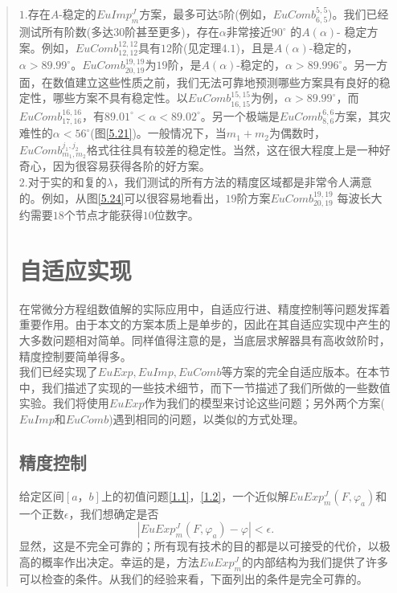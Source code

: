 \documentclass{article}
\begin{document}
\begin{CJK}{UTF8}{gkai}
\begin{quotation}
$1$.存在$A$-稳定的$EuImp^J_m$方案，最多可达$5$阶(例如，$EuComb^{5,5}_{6,5}$)。我们已经测试所有阶数(多达$30$阶甚至更多)，存在$\alpha$非常接近$90^{\circ}$ 的$A(\alpha)$- 稳定方案。例如，$EuComb_{12,12}^{12,12}$具有$12$阶(见定理$4.1$)，且是$A(\alpha)$-稳定的，$\alpha>89.99^{\circ}$。$EuComb^{19,19}_{20,19}$为$19$阶，是$A(\alpha)$-稳定的，$\alpha>89.996^{\circ}$。另一方面，在数值建立这些性质之前，我们无法可靠地预测哪些方案具有良好的稳定性，哪些方案不具有稳定性。以$EuComb^{15,15}_{16,15}$为例，$\alpha>89.99^{\circ}$，而$EuComb^{16,16}_{17,16}$，有$89.01^{\circ}<\alpha<89.02^{\circ}$。另一个极端是$EuComb^{6,6}_{8,6}$方案，其灾难性的$\alpha<56^{\circ}$(图\ref{5.21})。一般情况下，当$m_1+m_2$为偶数时，$EuComb^{j_1,j_2}_{m_1,m_2}$格式往往具有较差的稳定性。当然，这在很大程度上是一种好奇心，因为很容易获得各阶的好方案。\\

$2$.对于实的和复的$\lambda$，我们测试的所有方法的精度区域都是非常令人满意的。例如，从图\ref{5.24}可以很容易地看出，$19$阶方案$EuComb^{19,19}_{20,19}$ 每波长大约需要$18$个节点才能获得$10$位数字。\\
\section{自适应实现}

在常微分方程组数值解的实际应用中，自适应行进、精度控制等问题发挥着重要作用。由于本文的方案本质上是单步的，因此在其自适应实现中产生的大多数问题相对简单。同样值得注意的是，当底层求解器具有高收敛阶时，精度控制要简单得多。\\

我们已经实现了$EuExp,EuImp,EuComb$等方案的完全自适应版本。在本节中，我们描述了实现的一些技术细节，而下一节描述了我们所做的一些数值实验。我们将使用$EuExp$作为我们的模型来讨论这些问题；另外两个方案($EuImp$和$EuComb$)遇到相同的问题，以类似的方式处理。\\
\subsection{精度控制}

给定区间$[a，b]$上的初值问题\ref{1.1}，\ref{1.2}，一个近似解$EuExp^J_m(F,\varphi_a)$和一个正数$\epsilon$，我们想确定是否\\
\begin{equation}
\label{6.1}
|EuExp^J_m(F,\varphi_a)-\varphi|<\epsilon.
\end{equation}
显然，这是不完全可靠的；所有现有技术的目的都是以可接受的代价，以极高的概率作出决定。幸运的是，方法$EuExp^J_m$的内部结构为我们提供了许多可以检查的条件。从我们的经验来看，下面列出的条件是完全可靠的。\\


\end{quotation}
\end{CJK}
\end{document}
